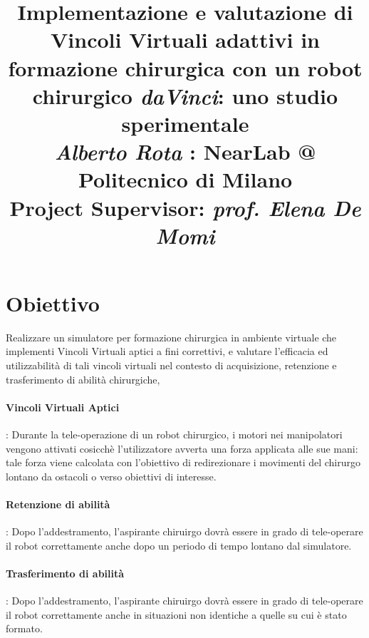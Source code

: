\documentclass{article}
\title{\textbf{Implementazione e valutazione di Vincoli Virtuali adattivi in formazione chirurgica con un robot chirurgico \textit{daVinci}: uno studio sperimentale}
\\
\vspace{0.5cm}\large{\textit{Alberto Rota} : NearLab @ Politecnico di Milano}
\\
\vspace{0.4cm}\small{Project Supervisor: \textit{prof. Elena De Momi}}
}
\author{}
\date{}
\begin{document}
\maketitle

\section{Obiettivo}
Realizzare un simulatore per formazione chirurgica in ambiente virtuale che implementi Vincoli Virtuali aptici a fini correttivi, e valutare l'efficacia ed utilizzabilità di tali vincoli virtuali nel contesto di acquisizione, retenzione e trasferimento di abilità chirurgiche, 

\paragraph*{Vincoli Virtuali Aptici}: 
Durante la tele-operazione di un robot chirurgico, i motori nei manipolatori vengono attivati cosicchè l'utilizzatore avverta una forza applicata alle sue mani: tale forza viene calcolata con l'obiettivo di redirezionare i movimenti del chirurgo lontano da ostacoli o verso obiettivi di interesse.
\paragraph*{Retenzione di abilità}: 
Dopo l'addestramento, l'aspirante chiruirgo dovrà essere in grado di tele-operare il robot correttamente anche dopo un periodo di tempo lontano dal simulatore.
\paragraph*{Trasferimento di abilità}: 
Dopo l'addestramento, l'aspirante chiruirgo dovrà essere in grado di tele-operare il robot correttamente anche in situazioni non identiche a quelle su cui è stato formato.
\end{document}
